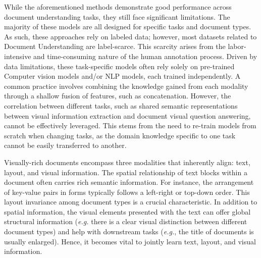 While the aforementioned methods demonstrate good performance across document understanding tasks, they still face significant limitations. The majority of these models are all designed for specific tasks and document types. As such, these approaches rely on labeled data; however, most datasets related to Document Understanding are label-scarce. This scarcity arises from the labor-intensive and time-consuming nature of the human annotation process. Driven by data limitations, these task-specific models often rely solely on pre-trained Computer vision models and/or \ac{NLP} models, each trained independently. A common practice involves combining the knowledge gained from each modality through a shallow fusion of features, such as concatenation. However, the correlation between different tasks, such as shared semantic representations between visual information extraction and document visual question answering, cannot be effectively leveraged. This stems from the need to re-train models from scratch when changing tasks, as the domain knowledge specific to one task cannot be easily transferred to another.


Visually-rich documents encompass three modalities that inherently align: text, layout, and visual information. The spatial relationship of text blocks within a document often carries rich semantic information. For instance, the arrangement of key-value pairs in forms typically follows a left-right or top-down order. This layout invariance among document types is a crucial characteristic. In addition to spatial information, the visual elements presented with the text can offer global structural information (\textit{e.g.} there is a clear visual distinction between different document types) and help with downstream tasks (\textit{e.g.}, the title of documents is usually enlarged). Hence, it becomes vital to jointly learn text, layout, and visual information.

